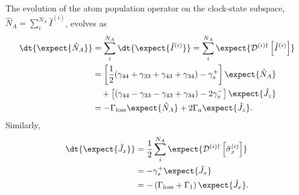 \documentclass[]{report}
\begin{document}
The evolution of the atom population operator on the clock-state subspace, $ \hat{N}_A=\sum_i^{N_A}\hat{I}^{(i)} $, evolves as
\begin{align}
\dt{\expect{\hat{N}_A}} &= \sum_i^{N_A} \dt{ \expect{\hat{I}^{(i)}}}  =\sum_i^{N_A} \expect{\mathcal{D}^{(i)\dagger}\left[\hat{I}^{(i)}\right] }\\
&= \left[\frac{1}{2}(\gamma_{44}+\gamma_{33}+\gamma_{43}+\gamma_{34}) -\gamma_s^+\right]\expect{\hat{N}_A} \nonumber \\
&\quad + \left[(\gamma_{44}-\gamma_{33}-\gamma_{43}+\gamma_{34}) -2\gamma_s^- \right] \expect{\hat{J}_z}\\
&= -\Gamma_{\rm loss}\expect{\hat{N}_A} +2\Gamma_a \expect{\hat{J}_z}. \label{Eq:NAt}
\end{align}
Similarly, 
\begin{align}
\dt{\expect{\hat{J}_x}} &= \frac{1}{2} \sum_i^{N_A} \expect{\mathcal{D}^{(i)\dagger}\left[\hat{\sigma}_x^{(i)} \right] }\\
&= -\gamma_s^+\expect{\hat{J}_x}\\
&= -\left(\Gamma_{\rm loss} +\Gamma_1 \right)\expect{\hat{J}_x} .
\end{align}

\end{document}
